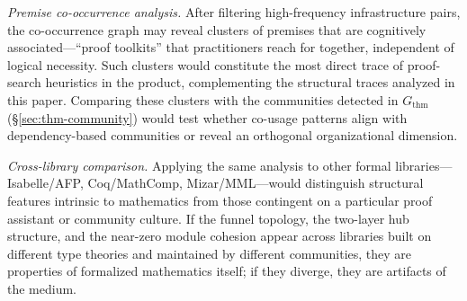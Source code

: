\emph{Premise co-occurrence analysis.} After filtering high-frequency infrastructure pairs, the co-occurrence graph may reveal clusters of premises that are cognitively associated---``proof toolkits'' that practitioners reach for together, independent of logical necessity. Such clusters would constitute the most direct trace of proof-search heuristics in the product, complementing the structural traces analyzed in this paper. Comparing these clusters with the communities detected in $G_{\mathrm{thm}}$ (\S\ref{sec:thm-community}) would test whether co-usage patterns align with dependency-based communities or reveal an orthogonal organizational dimension.

\emph{Cross-library comparison.} Applying the same analysis to other formal libraries---Isabelle/AFP, Coq/MathComp, Mizar/MML---would distinguish structural features intrinsic to mathematics from those contingent on a particular proof assistant or community culture. If the funnel topology, the two-layer hub structure, and the near-zero module cohesion appear across libraries built on different type theories and maintained by different communities, they are properties of formalized mathematics itself; if they diverge, they are artifacts of the medium.
